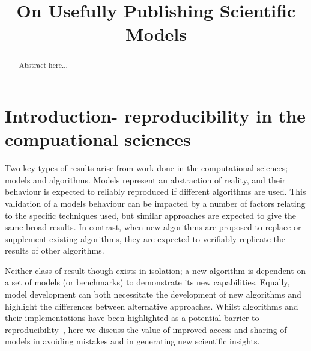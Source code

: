 \documentclass[conference]{IEEEtran}
\begin{document}

\title{On Usefully Publishing Scientific Models} 

\author{
\and
{}
}

\maketitle

\begin{abstract}
Abstract here...
\end{abstract}

\IEEEpeerreviewmaketitle

\section{Introduction- reproducibility in the compuational sciences}

Two key types of results arise from work done in the computational sciences; models 
and algorithms. Models represent an abstraction of reality, and their behaviour is
expected to reliably reproduced if different algorithms are used. This validation
of a models behaviour can be impacted by a number of factors relating to the specific
techniques used, but similar approaches are expected to give the same broad results. 
In contrast, when new algorithms are proposed to replace or supplement existing 
algorithms, they are expected to verifiably replicate the results of other algorithms.

Neither class of result though exists in isolation; a new algorithm is dependent on 
a set of models (or benchmarks) to demonstrate its new capabilities. Equally, model 
development can both necessitate the development of new algorithms and highlight the 
differences between alternative approaches. Whilst algorithms and their implementations
have been highlighted as a potential barrier to reproducibility~\cite{crick-et-al_wssspe2},
here we discuss the value of improved access and sharing of models in avoiding mistakes
and in generating new scientific insights. 
\end{document}
